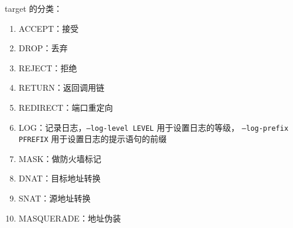 %
target 的分类：
\begin{enumerate}
  \item ACCEPT：接受
  \item DROP：丢弃
  \item REJECT：拒绝
  \item RETURN：返回调用链
  \item REDIRECT：端口重定向
  \item LOG：记录日志，\texttt{--log-level LEVEL} 用于设置日志的等级，
    \texttt{--log-prefix PFREFIX} 用于设置日志的提示语句的前缀
  \item MASK：做防火墙标记
  \item DNAT：目标地址转换
  \item SNAT：源地址转换
  \item MASQUERADE：地址伪装
\end{enumerate}
